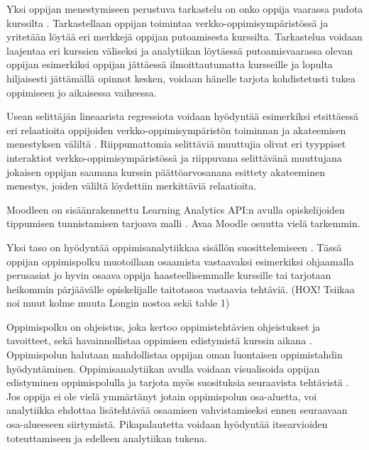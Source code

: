 Yksi oppijan menestymiseen perustuva tarkastelu on onko oppija vaarassa pudota kurssilta \citep{oliveSupervisedLearningFramework2018, suhonenUsingMoodleData2019}. Tarkastellaan oppijan toimintaa verkko-oppimisympäristössä ja yritetään löytää eri merkkejä oppijan putoamisesta kurssilta. Tarkastelua voidaan laajentaa eri kurssien väliseksi \citep{kinnari-korpelaOppimisanalytiikallaTehokkaampaanOhjaukseen2020} ja analytiikan löytäessä putoamisvaarassa olevan oppijan esimerkiksi oppijan jättäessä ilmoittautumatta kursseille ja lopulta hiljaisesti jättämällä opinnot kesken, voidaan hänelle tarjota kohdistetusti tukea oppimiseen jo aikaisessa vaiheessa.

Usean selittäjän lineaarista regressiota voidaan hyödyntää esimerkiksi etsittäessä eri relaatioita oppijoiden verkko-oppimisympäristön toiminnan ja akateemisen menestyksen väliltä \citep{agudo-peregrinaCanWePredict2014}. Riippumattomia selittäviä muuttujia olivat eri tyyppiset interaktiot verkko-oppimisympäristössä ja riippuvana selittävänä muuttujana jokaisen oppijan saamana kurssin päättöarvosanana esittety akateeminen menestys, joiden väliltä löydettiin merkittäviä relaatioita.


Moodleen on sisäänrakennettu Learning Analytics API:n avulla opiskelijoiden tippumisen tunnistamisen tarjoava malli \citep{oliveSupervisedLearningFramework2018,monllaoAnalyticsAPIMoodleDocs2021}. \color{red} Avaa Moodle osuutta vielä tarkemmin. \color{black}

Yksi taso on hyödyntää oppimisanalytiikkaa sisällön suosittelemiseen \citep{longPenetratingFogAnalytics2011,siemensLearningAnalyticsEmergence2013}. Tässä oppijan oppimispolku muotoillaan osaamista vastaavaksi esimerkiksi ohjaamalla perusasiat jo hyvin osaava oppija haasteellisemmalle kurssille tai tarjotaan heikommin pärjäävälle opiskelijalle taitotasoa vastaavia tehtäviä. \color{red}(HOX! Tsiikaa noi muut kolme muuta Longin nostoa sekä table 1)\color{black}

Oppimispolku on ohjeistus, joka kertoo oppimistehtävien ohjeistukset ja tavoitteet, sekä havainnollistaa oppimisen edistymistä kurssin aikana \citep{toivolaFlippedLearningKaanteinen2017}. Oppimispolun halutaan mahdollistaa oppijan oman luontaisen oppimistahdin hyödyntäminen. Oppimisanalytiikan avulla voidaan visualisoida oppijan edistyminen oppimispolulla ja tarjota myös suosituksia seuraavista tehtävistä \citep{longPenetratingFogAnalytics2011}. Jos oppija ei ole vielä ymmärtänyt jotain oppimispolun osa-aluetta, voi analytiikka ehdottaa lisätehtävää osaamisen vahvistamiseksi ennen seuraavaan osa-alueeseen siirtymistä. Pikapalautetta voidaan hyödyntää itsearvioiden toteuttamiseen ja edelleen analytiikan tukena.


